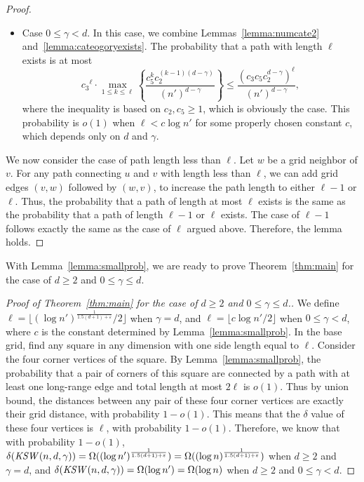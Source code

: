 \documentclass[11pt]{article}
\def\KSW{{\it KSW }}
\begin{document}
\begin{proof}
\begin{itemize}
This probability is $o(1)$ when 
	$\ell\leq(\log n')^{\frac{1}{1.5(d+1)+\varepsilon}}$ for any $\varepsilon>0$.
\item
Case $0\le \gamma < d$.
In this case, we combine Lemmas~\ref{lemma:numcate2} 
	and~\ref{lemma:cateogoryexists}.
The probability that a path with length $\ell$ exists is at most
\[{c_3}^\ell\cdot\max_{1\leq k\leq \ell}
	\left\{\frac{c_5^kc_2^{(k-1)(d-\gamma)}}{(n')^{d-\gamma}}\right\}
	\leq \frac{(c_3c_5c_2^{d-\gamma})^\ell}{(n')^{d-\gamma}},\]
where the inequality is based on $c_2,c_5 \ge 1$, which is obviously
	the case.
This probability is $o(1)$ when $\ell<c\log n'$ for 
	some properly chosen constant $c$, which depends only on $d$ and $\gamma$.
\end{itemize}

We now consider the case of path length less than $\ell$.
Let $w$ be a grid neighbor of $v$.
For any path connecting $u$ and $v$ with length less than $\ell$, 
	we can add grid edges $(v,w)$ followed by $(w,v)$, to increase the
	path length to either $\ell-1$ or $\ell$.
Thus, the probability that a path of length at most $\ell$ exists is
	the same as the probability that a path of length $\ell-1$ or
	$\ell$ exists.
The case of $\ell-1$ follows exactly the same as the case of $\ell$
	argued above.
Therefore, the lemma holds.
\end{proof}

With Lemma~\ref{lemma:smallprob}, we are ready to prove 
	Theorem~\ref{thm:main} 
	for the case of $d\ge 2$ and $0\le\gamma \le d$.

\begin{proof}
[Proof of Theorem~\ref{thm:main} for the case of $d\ge 2$ and $0\le \gamma \le d$.]
We define $\ell = \lfloor (\log n')^{\frac{1}{1.5(d+1)+\varepsilon}}/2 \rfloor$ when
	$\gamma=d$, and
	$\ell = \lfloor c \log n'/2 \rfloor$ when $0\le \gamma <d$, where
	$c$ is the constant determined by Lemma~\ref{lemma:smallprob}.
In the base grid, find any square in any dimension with one side length
	equal to $\ell$.
Consider the four corner vertices of the square.
By Lemma~\ref{lemma:smallprob}, the probability that
	a pair of corners of this square are connected by a 
	path with at least one long-range edge and total
	length at most $2\ell$ is $o(1)$.
Thus by union bound, the distances between any pair of these four corner
	vertices are exactly their grid distance, with probability $1-o(1)$.
This means that the $\delta$ value of these four vertices is $\ell$, 
	with probability $1-o(1)$.
Therefore, we know that with probability $1-o(1)$, 
	$\delta(\KSW(n, d, \gamma)) = \Omega((\log n')^{\frac{1}{1.5(d+1)+\varepsilon}}) = \Omega((\log n)^{\frac{1}{1.5(d+1)+\varepsilon}})$
	when $d \ge 2$ and $\gamma =d$, and
	$\delta(\KSW(n, d, \gamma)) = \Omega(\log n') = \Omega(\log n)$ when
	$d \ge 2$ and $0\le \gamma < d$.
\end{proof}
\end{document}
